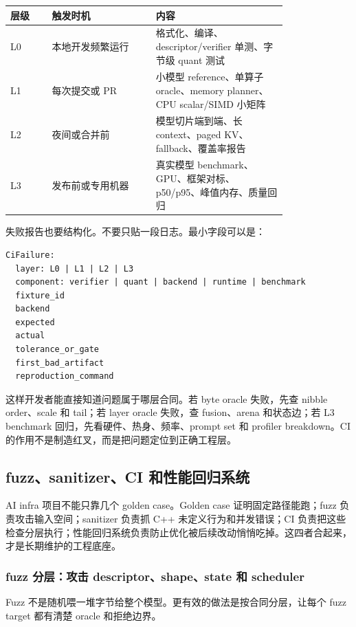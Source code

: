 \begin{center}
\begin{tabular}{p{0.12\linewidth}p{0.30\linewidth}p{0.38\linewidth}}
\toprule
层级 & 触发时机 & 内容 \\
\midrule
L0 & 本地开发频繁运行 & 格式化、编译、descriptor/verifier 单测、字节级 quant 测试 \\
L1 & 每次提交或 PR & 小模型 reference、单算子 oracle、memory planner、CPU scalar/SIMD 小矩阵 \\
L2 & 夜间或合并前 & 模型切片端到端、长 context、paged KV、fallback、覆盖率报告 \\
L3 & 发布前或专用机器 & 真实模型 benchmark、GPU、框架对标、p50/p95、峰值内存、质量回归 \\
\bottomrule
\end{tabular}
\end{center}

失败报告也要结构化。不要只贴一段日志。最小字段可以是：

\begin{lstlisting}[numbers=none,caption={CI failure 结构}]
CiFailure:
  layer: L0 | L1 | L2 | L3
  component: verifier | quant | backend | runtime | benchmark
  fixture_id
  backend
  expected
  actual
  tolerance_or_gate
  first_bad_artifact
  reproduction_command
\end{lstlisting}

这样开发者能直接知道问题属于哪层合同。若 byte oracle 失败，先查 nibble order、scale 和 tail；若 layer oracle 失败，查 fusion、arena 和状态边；若 L3 benchmark 回归，先看硬件、热身、频率、prompt set 和 profiler breakdown。CI 的作用不是制造红叉，而是把问题定位到正确工程层。

\subsection{fuzz、sanitizer、CI 和性能回归系统}

AI infra 项目不能只靠几个 golden case。Golden case 证明固定路径能跑；fuzz 负责攻击输入空间；sanitizer 负责抓 C++ 未定义行为和并发错误；CI 负责把这些检查分层执行；性能回归系统负责防止优化被后续改动悄悄吃掉。这四者合起来，才是长期维护的工程底座。

\subsubsection{fuzz 分层：攻击 descriptor、shape、state 和 scheduler}

Fuzz 不是随机喂一堆字节给整个模型。更有效的做法是按合同分层，让每个 fuzz target 都有清楚 oracle 和拒绝边界。

